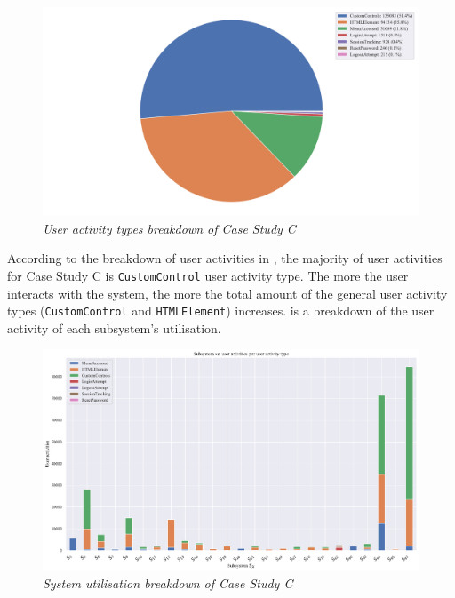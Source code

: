 \begin{figure}[!htb]
	\centering %
	\includegraphics[width=0.95\linewidth]{img/ch3/analysis/case_C_breakdown.pdf}
	\caption[User activity types breakdown of Case Study C]
	{\textit{User activity types breakdown of Case Study C}}\label{fig:ch3_caseCBreakdown}
\end{figure}

According to the breakdown of user activities in , the majority of user activities for Case Study C is \texttt{CustomControl} user activity type. The more the user interacts with the system, the more the total amount of the general user activity types (\texttt{CustomControl} and \texttt{HTMLElement}) increases.  is a breakdown of the user activity of each subsystem's utilisation.

\clearpage

\begin{figure}[!htb]
	\centering %
	\includegraphics[width=0.95\linewidth]{img/ch3/analysis/case_C_subsystems_1.pdf}
	\caption[System utilisation breakdown of Case Study C]
	{\textit{System utilisation breakdown of Case Study C}}\label{fig:ch3_caseCAnalysis}
\end{figure} 


